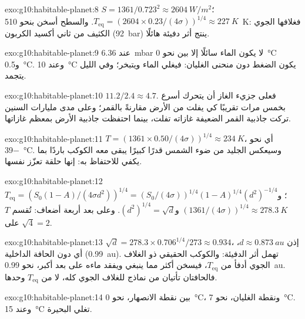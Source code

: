 \begin{solution}{exo:g10:habitable-planet:8}
$S = 1361/0.723^2 \approx \qty{2604}{W/m^2}$؛
$T_{\mathrm{eq}} = (2604 \times 0.23/(4\sigma))^{1/4} \approx \qty{227}{K}$.
والسطح أسخن بنحو \qty{510}{K}: فغلافها الجوي الكثيف من ثاني أكسيد الكربون
(\qty{92}{bar}) ينتج أثر دفيئة هائلًا.
\end{solution}

\begin{solution}{exo:g10:habitable-planet:9}
عند \qty{6.36}{mbar} لا يكون الماء سائلًا إلا بين نحو \qty{0}{\degreeCelsius}
و\qty{0.5}{\degreeCelsius}. وعند \qty{10}{\degreeCelsius} يكون الضغط دون منحنى
الغليان: فيغلي الماء ويتبخر؛ وفي الليل يتجمد.
\end{solution}

\begin{solution}{exo:g10:habitable-planet:10}
$11.2/2.4 \approx 4.7$. فعلى جزيء الغاز أن يتحرك أسرع بخمس مرات تقريبًا كي
يفلت من الأرض مقارنةً بالقمر؛ وعلى مدى مليارات السنين تركت جاذبية القمر
الضعيفة غازاته تفلت، بينما احتفظت جاذبية الأرض بمعظم غازاتها.
\end{solution}

\begin{solution}{exo:g10:habitable-planet:11}
$T = (1361 \times 0.50/(4\sigma))^{1/4} \approx \qty{234}{K}$، أي نحو
\qty{-39}{\degreeCelsius}. وسيعكس الجليد من ضوء الشمس قدرًا كبيرًا يبقى معه
الكوكب باردًا بما يكفي للاحتفاظ به: إنها حلقة تعزّز نفسها.
\end{solution}

\begin{solution}{exo:g10:habitable-planet:12}
$T_{\mathrm{eq}} = (S_0(1-A)/(4\sigma d^2))^{1/4} = (S_0/(4\sigma))^{1/4}
(1-A)^{1/4} (d^2)^{-1/4}$؛ و$(1361/(4\sigma))^{1/4} \approx \qty{278.3}{K}$
و$(d^2)^{1/4} = \sqrt d$. وعلى بعد أربعة أضعاف: تُقسم $T$ على $\sqrt 4 = 2$.
\end{solution}

\begin{solution}{exo:g10:habitable-planet:13}
$\sqrt d = 278.3 \times 0.706^{1/4}/273 \approx 0.934$، إذن $d \approx
\qty{0.873}{au}$، أي دون الحافة الداخلية (\qty{0.99}{au}). 
تهمل أثر الدفيئة: والكوكب الحقيقي ذو الغلاف الجوي أدفأ من $T_{\mathrm{eq}}$،
فيسخن أكثر مما ينبغي ويفقد ماءه على بعد أكبر، نحو \qty{0.99}{au}. فالحافتان
تأتيان من نماذج للغلاف الجوي كله، لا من $T_{\mathrm{eq}}$ وحدها.
\end{solution}

\begin{solution}{exo:g10:habitable-planet:14}
بين نقطة الانصهار، نحو \qty{0}{\degreeCelsius}، ونقطة الغليان، نحو
\qty{7}{\degreeCelsius}. وعند \qty{15}{\degreeCelsius} تغلي
البحيرة.
\end{solution}

